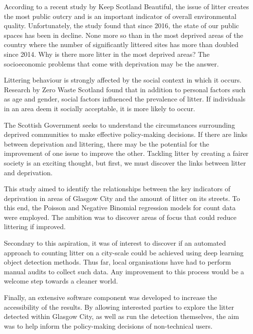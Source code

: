 \documentclass{thesis}
\begin{document}
According to a recent study by Keep Scotland Beautiful, the issue of litter creates the most public outcry and is an important indicator of overall environmental quality\cite{household-survey-2019}. Unfortunately, the study found that since 2016, the state of our public spaces has been in decline. None more so than in the most deprived areas of the country where the number of significantly littered sites has more than doubled since 2014. Why is there more litter in the most deprived areas? The socioeconomic problems that come with deprivation may be the answer.

Littering behaviour is strongly affected by the social context in which it occurs\cite{littering-behaviour}. Research by Zero Waste Scotland found that in addition to personal factors such as age and gender, social factors influenced the prevalence of litter. If individuals in an area deem it socially acceptable, it is more likely to occur. 

The Scottish Government seeks to understand the circumstances surrounding deprived communities to make effective policy-making decisions. If there are links between deprivation and littering, there may be the potential for the improvement of one issue to improve the other. Tackling litter by creating a fairer society is an exciting thought, but first, we must discover the links between litter and deprivation.

This study aimed to identify the relationships between the key indicators of deprivation in areas of Glasgow City and the amount of litter on its streets. To this end, the Poisson and Negative Binomial regression models for count data were employed. The ambition was to discover areas of focus that could reduce littering if improved.

Secondary to this aspiration, it was of interest to discover if an automated approach to counting litter on a city-scale could be achieved using deep learning object detection methods. Thus far, local organisations have had to perform manual audits to collect such data. Any improvement to this process would be a welcome step towards a cleaner world.

Finally, an extensive software component was developed to increase the accessibility of the results. By allowing interested parties to explore the litter detected within Glasgow City, as well as run the detection themselves, the aim was to help inform the policy-making decisions of non-technical users.

\end{document}
